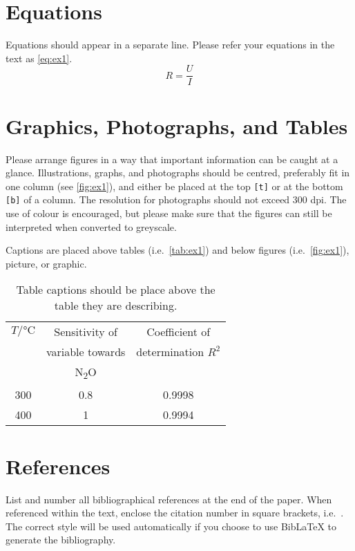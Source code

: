\documentclass{ama}
\begin{document}
\section{Equations}
Equations should appear in a separate line.
Please refer your equations in the text as \autoref{eq:ex1}.
%
\begin{equation}
    R = \frac{U}{I}\label{eq:ex1}
\end{equation}

\section{Graphics, Photographs, and Tables}
Please arrange figures in a way that important information can be caught at a glance.
Illustrations, graphs, and photographs should be centred, preferably fit in one column (see \autoref{fig:ex1}), and either be placed at the top \texttt{[t]} or at the bottom \texttt{[b]} of a column.
The resolution for photographs should not exceed 300 dpi.
The use of colour is encouraged, but please make sure that the figures can still be interpreted when converted to greyscale.

Captions are placed above tables (i.e.\ \autoref{tab:ex1}) and below figures (i.e.\ \autoref{fig:ex1}), picture, or graphic.
%
\begin{table}
    \caption{Table captions should be place above the table they are describing.}\label{tab:ex1}
    \centering
    \begin{tabular}{ccc}
        \toprule
        \(T / \si{\celsius}\) & Sensitivity of & Coefficient of \\
        & variable towards & determination \(R^2\)  \\
        & N\textsubscript{2}O & \\
        \midrule
        \num{300} & \num{0.8} & \num{0.9998} \\
        \midrule
        \num{400} & \num{1} & \num{0.9994} \\
        \bottomrule
    \end{tabular}
\end{table}

\section{References}
List and number all bibliographical references at the end of the paper.
When referenced within the text, enclose the citation number in square brackets, i.e.~\cite{mouse2011}.
The correct style will be used automatically if you choose to use Bib\LaTeX{} to generate the bibliography.
\end{document}
